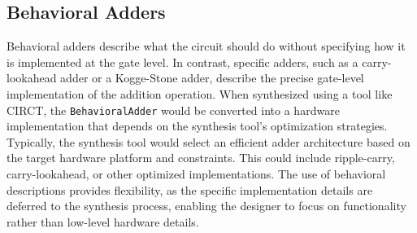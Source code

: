 \subsection{Behavioral Adders}
Behavioral adders describe what the circuit should do without specifying how it is implemented at the gate level. In contrast, specific adders, such as a carry-lookahead adder or a Kogge-Stone adder, describe the precise gate-level implementation of the addition operation. When synthesized using a tool like CIRCT, the \texttt{BehavioralAdder} would be converted into a hardware implementation that depends on the synthesis tool's optimization strategies. Typically, the synthesis tool would select an efficient adder architecture based on the target hardware platform and constraints. This could include ripple-carry, carry-lookahead, or other optimized implementations. The use of behavioral descriptions provides flexibility, as the specific implementation details are deferred to the synthesis process, enabling the designer to focus on functionality rather than low-level hardware details.


